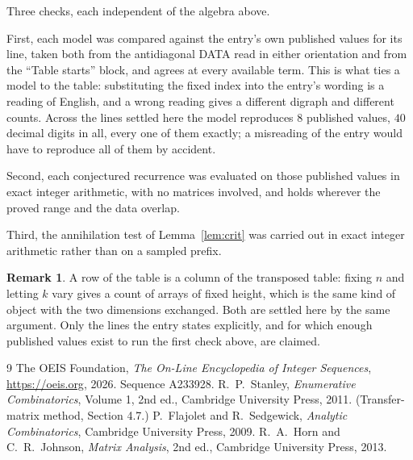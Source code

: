 \documentclass[11pt,a4paper]{article}
\theoremstyle{plain}
\theoremstyle{definition}
\newtheorem{remark}[theorem]{Remark}
\begin{document}
Three checks, each independent of the algebra above.

First, each model was compared against the entry's own published values for its line, taken
both from the antidiagonal DATA read in either orientation and from the ``Table starts''
block, and agrees at every available term. This is what ties a model to the table:
substituting the fixed index into the entry's wording is a reading of English, and a wrong
reading gives a different digraph and different counts. Across the lines settled here the
model reproduces $8$ published values, $40$ decimal digits in all, every one of
them exactly; a misreading of the entry would have to reproduce all of them by accident.

Second, each conjectured recurrence was evaluated on those published values in exact
integer arithmetic, with no matrices involved, and holds wherever the proved range and the
data overlap.

Third, the annihilation test of Lemma~\ref{lem:crit} was carried out in exact integer
arithmetic rather than on a sampled prefix.

\begin{remark}
A row of the table is a column of the transposed table: fixing $n$ and letting $k$ vary gives a
count of arrays of fixed height, which is the same kind of object with the two dimensions
exchanged. Both are settled here by the same argument. Only the lines the entry states
explicitly, and for which enough published values exist to run the first check above, are
claimed.
\end{remark}

\begin{thebibliography}{9}
 The OEIS Foundation, \emph{The On-Line Encyclopedia of Integer
Sequences}, \url{https://oeis.org}, 2026. Sequence A233928.
 R.~P.~Stanley, \emph{Enumerative Combinatorics}, Volume 1, 2nd ed.,
Cambridge University Press, 2011. (Transfer-matrix method, Section 4.7.)
 P.~Flajolet and R.~Sedgewick, \emph{Analytic Combinatorics}, Cambridge
University Press, 2009.
 R.~A.~Horn and C.~R.~Johnson, \emph{Matrix Analysis}, 2nd ed., Cambridge
University Press, 2013.
\end{thebibliography}
\end{document}
